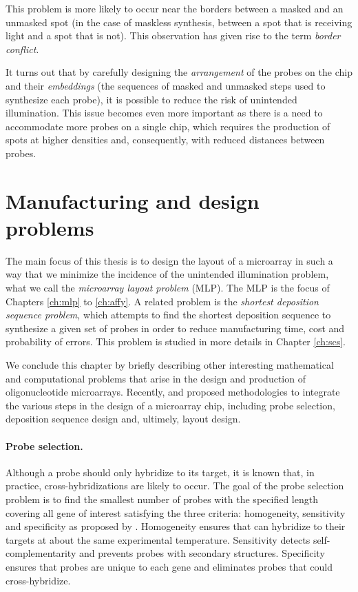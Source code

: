 This problem is more likely to occur near the borders between a masked and an
unmasked spot (in the case of maskless synthesis, between a spot that is
receiving light and a spot that is not). This observation has given rise to the
term \emph{border conflict}.

It turns out that by carefully designing the \emph{arrangement} of the probes on
the chip and their \emph{embeddings} (the sequences of masked and unmasked steps
used to synthesize each probe), it is possible to reduce the risk of unintended
illumination. This issue becomes even more important as there is a need to
accommodate more probes on a single chip, which requires the production of spots
at higher densities and, consequently, with reduced distances between probes.

\section{Manufacturing and design problems}
\label{sec:intro_problems}

The main focus of this thesis is to design the layout of a microarray in such a
way that we minimize the incidence of the unintended illumination problem, what
we call the \emph{microarray layout problem} (MLP). The MLP is the focus of
Chapters \ref{ch:mlp} to \ref{ch:affy}. A related problem is the \emph{shortest
deposition sequence problem}, which attempts to find the shortest deposition
sequence to synthesize a given set of probes in order to reduce manufacturing
time, cost and probability of errors. This problem is studied in more details in
Chapter \ref{ch:scs}.

We conclude this chapter by briefly describing other interesting mathematical
and computational problems that arise in the design and production of
oligonucleotide microarrays. Recently, \citet{Kahng2003b,Kahng2006} and
\citet{Atlas2004} proposed methodologies to integrate the various steps in the
design of a microarray chip, including probe selection, deposition sequence
design and, ultimely, layout design.

\paragraph{Probe selection.} Although a probe should only hybridize to its
target, it is known that, in practice, cross-hybridizations are likely to occur.
The goal of the probe selection problem is to find the smallest number of probes
with the specified length covering all gene of interest satisfying the three
criteria: homogeneity, sensitivity and specificity as proposed by
\citep{Lockhart1996}. Homogeneity ensures that can hybridize to their targets at
about the same experimental temperature. Sensitivity detects
self-complementarity and prevents probes with secondary structures. Specificity
ensures that probes are unique to each gene and eliminates probes that could
cross-hybridize.

